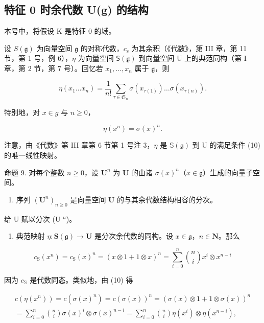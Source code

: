 \subsection{特征 0 时余代数 U(g) 的结构}

本号中，将假设 K 是特征 0 的域。

设 \(S(\mathfrak{g})\) 为向量空间 \(\mathfrak{g}\) 的对称代数，\(c_{\mathrm{s}}\) 为其余积（《代数》，第 III 章，第 11 节，第 1 号，例 6），\(\eta\) 为向量空间 \(\mathsf{S}(\mathfrak{g})\) 到向量空间 U 上的典范同构（第 I 章，第 2 节，第 7 号）。回忆若 \(x_{1},\ldots ,x_{n}\) 属于 \(\mathfrak{g}\)，则

\[
\eta (x _ {1} \dots x _ {n}) = \frac {1}{n !} \sum_ {\tau \in \mathfrak {S} _ {n}} \sigma (x _ {\tau (1)}) \dots \sigma (x _ {\tau (n)}).\tag{9}
\]

特别地，对 \(x \in g\) 与 \(n \geqslant 0\)，

\[
\eta (x ^ {n}) = \sigma (x) ^ {n}.\tag{10}
\]

注意，由《代数》第 III 章第 6 节第 1 号注 3，\(\eta\) 是 \(\mathbb{S}(\mathfrak{g})\) 到 U 的满足条件 (10) 的唯一线性映射。

命题 9. 对每个整数 \(n \geqslant 0\)，设 \(\mathbf{U}^n\) 为 \(\mathbf{U}\) 的由诸 \(\sigma(x)^n\)（\(x \in \mathfrak{g}\)）生成的向量子空间。

\begin{enumerate}
\def\labelenumi{(\alph{enumi})}
\tightlist
\item
  序列 \((\mathbf{U}^n)_{n\geqslant 0}\) 是向量空间 \(\mathbf{U}\) 的与其余代数结构相容的分次。
\end{enumerate}

给 U 赋以分次 (U \(^{n}\))。

\begin{enumerate}
\def\labelenumi{(\alph{enumi})}
\setcounter{enumi}{1}
\tightlist
\item
  典范映射 \(\eta: \mathbf{S}(\mathfrak{g}) \to \mathbf{U}\) 是分次余代数的同构。设 \(x \in \mathfrak{g}\)，\(n \in \mathbf{N}\)。那么
\end{enumerate}

\[
c _ {\mathrm{S}} (x ^ {n}) = c _ {\mathrm{S}} (x) ^ {n} = (x \otimes 1 + 1 \otimes x) ^ {n} = \sum_ {i = 0} ^ {n} {\binom {n} {i}} x ^ {i} \otimes x ^ {n - i}\tag{11}
\]

因为 \(c_{\mathbb{S}}\) 是代数同态。类似地，由 (10) 得

\[
\begin{array}{l} c (\eta (x ^ {n})) = c (\sigma (x) ^ {n}) = c (\sigma (x)) ^ {n} = (\sigma (x) \otimes 1 + 1 \otimes \sigma (x)) ^ {n} \\ = \sum_ {i = 0} ^ {n} \binom {n} {i} \sigma (x) ^ {i} \otimes \sigma (x) ^ {n - i} = \sum_ {i = 0} ^ {n} \binom {n} {i} \eta (x ^ {i}) \otimes \eta (x ^ {n - i}), \end{array}\tag{12}
\]

